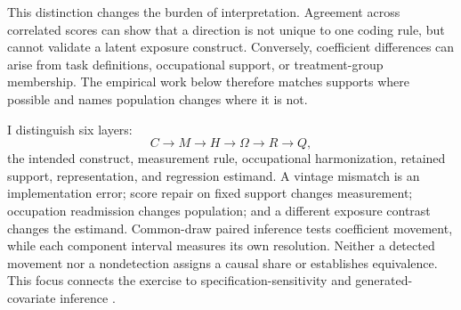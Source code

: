 This distinction changes the burden of interpretation.  Agreement across correlated scores can show that a direction is not unique to one coding rule, but cannot validate a latent exposure construct.  Conversely, coefficient differences can arise from task definitions, occupational support, or treatment-group membership.  The empirical work below therefore matches supports where possible and names population changes where it is not.

I distinguish six layers:
\[
C\longrightarrow M\longrightarrow H\longrightarrow \Omega\longrightarrow R\longrightarrow Q,
\]
the intended construct, measurement rule, occupational harmonization, retained support, representation, and regression estimand.  A vintage mismatch is an implementation error; score repair on fixed support changes measurement; occupation readmission changes population; and a different exposure contrast changes the estimand.  Common-draw paired inference tests coefficient movement, while each component interval measures its own resolution.  Neither a detected movement nor a nondetection assigns a causal share or establishes equivalence.  This focus connects the exercise to specification-sensitivity and generated-covariate inference \citep{andrews2017sensitivity,rambachan2023credible,battaglia2024inference,christensen2026valid,duan2026inference,ludwig2026large}.
